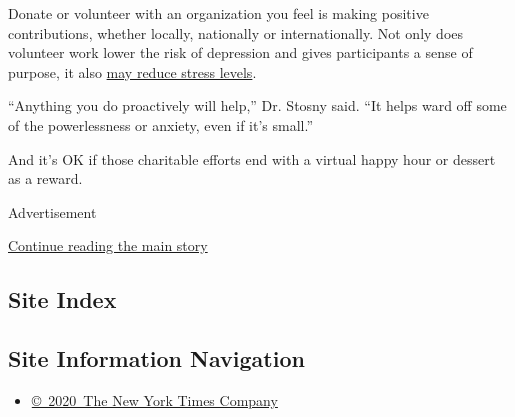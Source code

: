Donate or volunteer with an organization you feel is making positive
contributions, whether locally, nationally or internationally. Not only
does volunteer work lower the risk of depression and gives participants
a sense of purpose, it also
\href{https://www.mayoclinichealthsystem.org/hometown-health/speaking-of-health/helping-people-changing-lives-the-6-health-benefits-of-volunteering}{may
reduce stress levels}.

``Anything you do proactively will help,'' Dr. Stosny said. ``It helps
ward off some of the powerlessness or anxiety, even if it's small.''

And it's OK if those charitable efforts end with a virtual happy hour or
dessert as a reward.

Advertisement

\protect\hyperlink{after-bottom}{Continue reading the main story}

\hypertarget{site-index}{%
\subsection{Site Index}\label{site-index}}

\hypertarget{site-information-navigation}{%
\subsection{Site Information
Navigation}\label{site-information-navigation}}

\begin{itemize}
\tightlist
\item
  \href{https://help.nytimes3xbfgragh.onion/hc/en-us/articles/115014792127-Copyright-notice}{©~2020~The
  New York Times Company}
\end{itemize}

